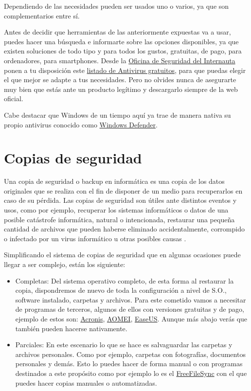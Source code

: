 \documentclass[
  spanish,
  a4paper,
  openany]{book}
\begin{document}
Dependiendo de las necesidades pueden ser usados uno o varios, ya que son complementarios entre sí.

Antes de decidir que herramientas de las anteriormente expuestas va a usar, puedes hacer una búsqueda e informarte sobre las opciones disponibles, ya que existen soluciones de todo tipo y para todos los gustos, gratuitas, de pago, para ordenadores, para smartphones. Desde la \href{https://www.osi.es}{Oficina de Seguridad del Internauta} ponen a tu disposición este \href{https://www.osi.es/es/herramientas-gratuitas?herramienta_selec\%5B0\%5D=115}{listado de Antivirus gratuitos}, para que puedas elegir el que mejor se adapte a tus necesidades. Pero no olvides nunca de asegurarte muy bien que estás ante un producto legítimo y descargarlo siempre de la web oficial.

Cabe destacar que Windows de un tiempo aquí ya trae de manera nativa su propio antivirus conocido como \href{https://www.microsoft.com/es-es/windows/comprehensive-security}{Windows Defender}.

\hypertarget{copias-de-seguridad}{%
\section{Copias de seguridad}\label{copias-de-seguridad}}

Una copia de seguridad o backup en informática es una copia de los datos originales que se realiza con el fin de disponer de un medio para recuperarlos en caso de su pérdida. Las copias de seguridad son útiles ante distintos eventos y usos, como por ejemplo, recuperar los sistemas informáticos o datos de una posible catástrofe informática, natural o intencionada, restaurar una pequeña cantidad de archivos que pueden haberse eliminado accidentalmente, corrompido o infectado por un virus informático u otras posibles causas \citep{WIKI-copias-seguridad}.

Simplificando el sistema de copias de seguridad que en algunas ocasiones puede llegar a ser complejo, están los siguiente:

\begin{itemize}
\item
  Completas: Del sistema operativo completo, de esta forma al restaurar la copia, dispondremos de nuevo de toda la configuración a nivel de S.O., software instalado, carpetas y archivos. Para este cometido vamos a necesitar de programas de terceros, algunos de ellos con versiones gratuitas y de pago, ejemplo de estos son: \href{https://www.acronis.com/}{Acronis}, \href{https://www.aomeitech.com/}{AOMEI}, \href{https://www.easeus.com/}{EaseUS}. Aunque más abajo verás que también pueden hacerse nativamente.
\item
  Parciales: En este escenario lo que se hace es salvaguardar las carpetas y archivos personales. Como por ejemplo, carpetas con fotografías, documentos personales y demás. Esto lo puedes hacer de forma manual o con programas destinados a este propósito como por ejemplo lo es el \href{https://freefilesync.org/}{FreeFileSync} con el que puedes hacer copias manuales o automatizadas.
\end{itemize}
\end{document}

